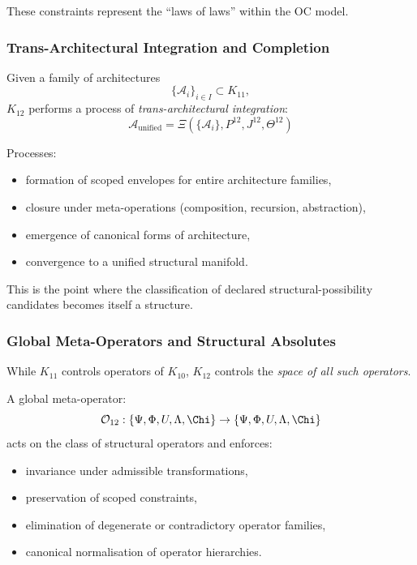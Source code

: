These constraints represent the ``laws of laws'' within the OC model.

\subsubsection{Trans-Architectural Integration and Completion}

Given a family of architectures
\[
\{\mathcal{A}_i\}_{i \in I} \subset K_{11},
\]
$K_{12}$ performs a process of \emph{trans-architectural integration}:
\[
\mathcal{A}_{\text{unified}}
= \Xi(\{\mathcal{A}_i\}, P^{12}, J^{12}, \Theta^{12})
\]

Processes:
\begin{itemize}
    \item formation of scoped envelopes for entire architecture families,
    \item closure under meta-operations (composition, recursion, abstraction),
    \item emergence of canonical forms of architecture,
    \item convergence to a unified structural manifold.
\end{itemize}

This is the point where the classification of declared structural-possibility candidates becomes
itself a structure.

\subsubsection{Global Meta-Operators and Structural Absolutes}

While $K_{11}$ controls operators of $K_{10}$,
$K_{12}$ controls the \emph{space of all such operators}.

A global meta-operator:
\[
\mathcal{O}_{12} :
\{\Psi, \Phi, U, \Lambda, \Chi\}
\to
\{\Psi, \Phi, U, \Lambda, \Chi\}
\]
acts on the class of structural operators and enforces:
\begin{itemize}
    \item invariance under admissible transformations,
    \item preservation of scoped constraints,
    \item elimination of degenerate or contradictory operator families,
    \item canonical normalisation of operator hierarchies.
\end{itemize}


